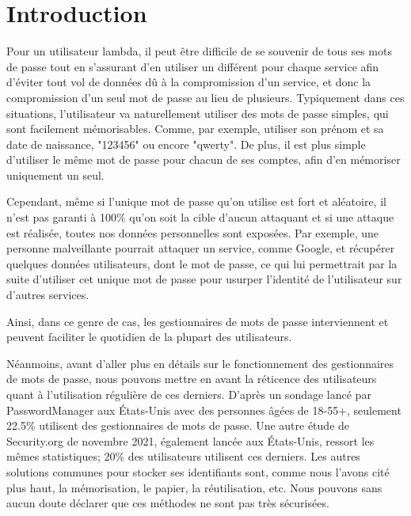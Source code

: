 

\chapter{Introduction}
\label{ch:intro}

Pour un utilisateur lambda, il peut être difficile de se souvenir de tous ses mots de passe tout en s'assurant d'en utiliser un différent pour chaque service afin d'éviter tout vol de données dû à la compromission d'un service, et donc la compromission d'un seul mot de passe au lieu de plusieurs. Typiquement dans ces situations, l'utilisateur va naturellement utiliser des mots de passe simples, qui sont facilement mémorisables. Comme, par exemple, utiliser son prénom et sa date de naissance, "123456" ou encore "qwerty". De plus, il est plus simple d'utiliser le même mot de passe pour chacun de ses comptes, afin d'en mémoriser uniquement un seul. 

Cependant, même si l'unique mot de passe qu'on utilise est fort et aléatoire, il n'est pas garanti à 100\% qu'on soit la cible d'aucun attaquant et si une attaque est réalisée, toutes nos données personnelles sont exposées. Par exemple, une personne malveillante pourrait attaquer un service, comme Google, et récupérer quelques données utilisateurs, dont le mot de passe, ce qui lui permettrait par la suite d'utiliser cet unique mot de passe pour usurper l'identité de l'utilisateur sur d'autres services.

Ainsi, dans ce genre de cas, les gestionnaires de mots de passe interviennent et peuvent faciliter le quotidien de la plupart des utilisateurs. 

Néanmoins, avant d'aller plus en détails sur le fonctionnement des gestionnaires de mots de passe, nous pouvons mettre en avant la réticence des utilisateurs quant à l'utilisation régulière de ces derniers. D'après un sondage lancé par PasswordManager\cite{PMC} aux États-Unis avec des personnes âgées de 18-55+, seulement 22.5\% utilisent des gestionnaires de mots de passe. Une autre étude de Security.org\cite{PM21} de novembre 2021, également lancée aux États-Unis, ressort les mêmes statistiques; 20\% des utilisateurs utilisent ces derniers. Les autres solutions communes pour stocker ses identifiants sont, comme nous l'avons cité plus haut, la mémorisation, le papier, la réutilisation, etc. Nous pouvons sans aucun doute déclarer que ces méthodes ne sont pas très sécurisées.

